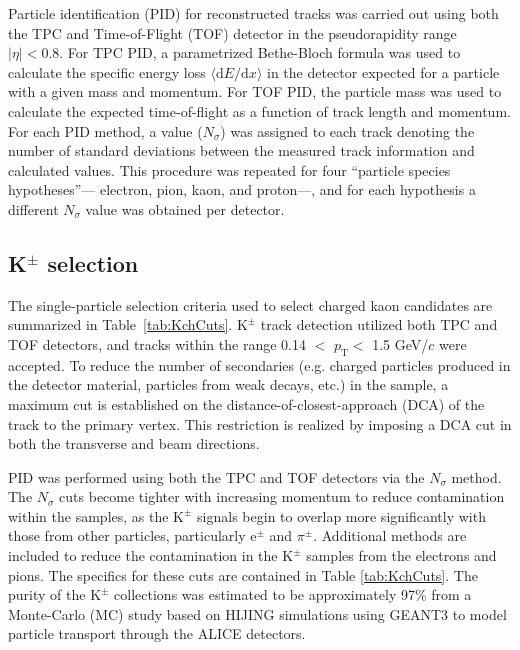 \documentclass[ALICE,manyauthors]{cernphprep}
\newcommand{\pt}{$p_{\mathrm{T}}$\xspace}
\newcommand{\Kpm}{$\mathrm{K^{\pm}}$\xspace}
\begin{document}
Particle identification (PID) for reconstructed tracks was carried out using both the TPC and Time-of-Flight (TOF) detector \cite{Abelev:2014ffa, Akindinov:2013tea} in the pseudorapidity range $|\eta| < 0.8$.  
For TPC PID, a parametrized Bethe-Bloch formula was used to calculate the specific energy loss $\langle \mathrm{d}E/\mathrm{d}x \rangle$ in the detector expected for a particle with a given mass and momentum.  
For TOF PID, the particle mass was used to calculate the expected time-of-flight as a function of track length and momentum.  
For each PID method, a value ($N_{\sigma}$) was assigned to each track denoting the number of standard deviations between the measured track information and calculated values.  
This procedure was repeated for four ``particle species hypotheses''--- electron, pion, kaon, and proton---, and for each hypothesis a different $N_{\sigma}$ value was obtained per detector.


\subsection{K$^{\pm}$ selection}
\label{sec:KchSelection}
The single-particle selection criteria used to select charged kaon candidates are summarized in Table~\ref{tab:KchCuts}.
\Kpm track detection utilized both TPC and TOF detectors, and tracks within the range 0.14 $<$ \pt $<$ 1.5 GeV/$c$ were accepted.
To reduce the number of secondaries (e.g. charged particles produced in the detector material, particles from weak decays, etc.) in the sample, a maximum cut is established on the distance-of-closest-approach (DCA) of the track to the primary vertex.
This restriction is realized by imposing a DCA cut in both the transverse and beam directions.

PID was performed using both the TPC and TOF detectors via the $N_{\sigma}$ method. 
The $N_{\sigma}$ cuts become tighter with increasing momentum to reduce contamination within the samples, as the \Kpm signals begin to overlap more significantly with those from other particles, particularly e$^{\pm}$ and $\pi^{\pm}$.
Additional methods are included to reduce the contamination in the \Kpm samples from the electrons and pions.  
The specifics for these cuts are contained in Table \ref{tab:KchCuts}.
The purity of the \Kpm collections was estimated to be approximately 97\% from a Monte-Carlo (MC) study based on HIJING \cite{PhysRevD.44.3501} simulations using GEANT3 \cite{Brun:1994aa} to model particle transport through the ALICE detectors. 
\end{document}
